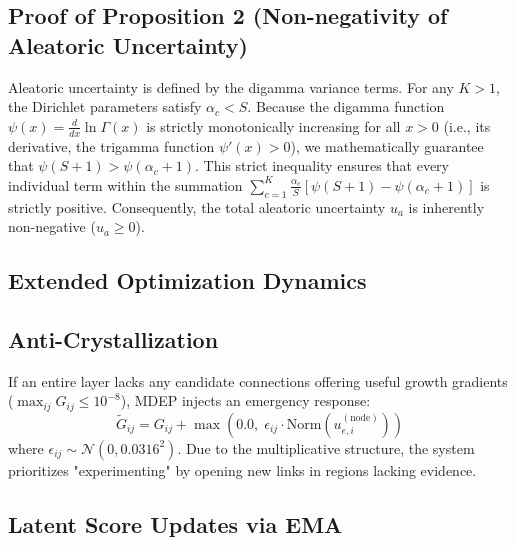 \documentclass[letterpaper]{article} %
\begin{document}
\subsection{Proof of Proposition 2 (Non-negativity of Aleatoric Uncertainty)}
Aleatoric uncertainty is defined by the digamma variance terms. For any $K > 1$, the Dirichlet parameters satisfy $\alpha_c < S$. Because the digamma function $\psi(x) = \frac{d}{dx} \ln \Gamma(x)$ is strictly monotonically increasing for all $x > 0$ (i.e., its derivative, the trigamma function $\psi'(x) > 0$), we mathematically guarantee that $\psi(S + 1) > \psi(\alpha_c + 1)$. This strict inequality ensures that every individual term within the summation $\sum_{c=1}^K \frac{\alpha_c}{S} [\psi(S + 1) - \psi(\alpha_c + 1)]$ is strictly positive. Consequently, the total aleatoric uncertainty $u_a$ is inherently non-negative ($u_a \ge 0$).


\subsection{Extended Optimization Dynamics}
\subsection{Anti-Crystallization}\label{subsec:anti_crystal}

If an entire layer lacks any candidate connections offering useful growth gradients ($\max_{ij} G_{ij} \le 10^{-8}$), MDEP injects an emergency response:
\begin{equation}\label{eq:anti_crystal_eq}
    \tilde{G}_{ij} = G_{ij} + \max\!\left(0.0,\; \epsilon_{ij} \cdot \text{Norm}(u_{e,i}^{(\text{node})})\right)
\end{equation}
where $\epsilon_{ij} \sim \mathcal{N}(0, 0.0316^2)$. Due to the multiplicative structure, the system prioritizes "experimenting" by opening new links in regions lacking evidence.

\subsection{Latent Score Updates via EMA}\label{subsec:score_update}
\end{document}
